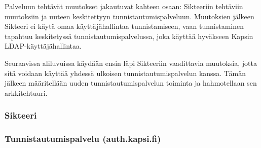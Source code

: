 Palveluun tehtävät muutokset jakautuvat kahteen osaan: Sikteeriin tehtäviin muutoksiin ja uuteen keskitettyyn tunnistautumispalveluun. Muutoksien jälkeen Sikteeri ei käytä omaa käyttäjähallintaa tunnistamiseen, vaan tunnistaminen tapahtuu keskitetyssä tunnistautumispalvelussa, joka käyttää hyväkseen Kapsin LDAP-käyttäjähallintaa.

Seuraavissa aliluvuissa käydään ensin läpi Sikteeriin vaadittavia muutoksia, jotta sitä voidaan käyttää yhdessä ulkoisen tunnistautumispalvelun kanssa. Tämän jälkeen määritellään uuden tunnistautumispalvelun toiminta ja hahmotellaan sen arkkitehtuuri.

\subsubsection{Sikteeri}

\subsubsection{Tunnistautumispalvelu (auth.kapsi.fi)}
